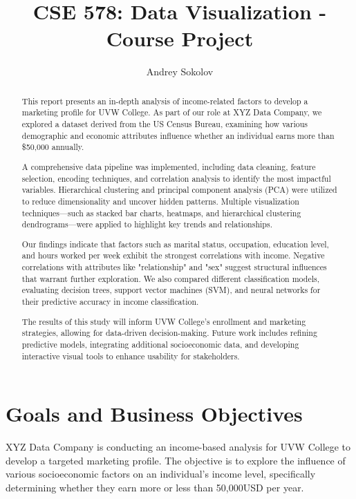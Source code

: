 \documentclass[journal,onecolumn]{IEEEtran}
\begin{document}
\title{CSE 578: Data Visualization - Course Project}

\author{Andrey Sokolov}

\maketitle

\begin{abstract}
    This report presents an in-depth analysis of income-related factors to develop a
    marketing profile for UVW College. As part of our role at XYZ Data Company, we
    explored a dataset derived from the US Census Bureau, examining how various
    demographic and economic attributes influence whether an individual earns more than \$50,000 annually. 
    
    A comprehensive data pipeline was implemented, including data cleaning, feature
    selection, encoding techniques, and correlation analysis to identify the most
    impactful variables. Hierarchical clustering and principal component analysis
    (PCA) were utilized to reduce dimensionality and uncover hidden patterns.
    Multiple visualization techniques—such as stacked bar charts, heatmaps, and hierarchical clustering dendrograms—were applied to highlight key trends and relationships.
    
    Our findings indicate that factors such as marital status, occupation,
    education level, and hours worked per week exhibit the strongest correlations
    with income. Negative correlations with attributes like "relationship" and
    "sex" suggest structural influences that warrant further exploration.
    We also compared different classification models, evaluating decision trees,
    support vector machines (SVM), and neural networks for their predictive accuracy in income classification.
    
    The results of this study will inform UVW College’s enrollment and marketing strategies,
    allowing for data-driven decision-making. Future work includes refining predictive models,
    integrating additional socioeconomic data, and developing interactive visual tools to enhance usability for stakeholders.
    \end{abstract}

\section{Goals and Business Objectives}
XYZ Data Company is conducting an income-based analysis for UVW College to develop
a targeted marketing profile. The objective is to explore the influence of various
socioeconomic factors on an individual’s income level, specifically determining
whether they earn more or less than 50,000USD per year.
\end{document}
